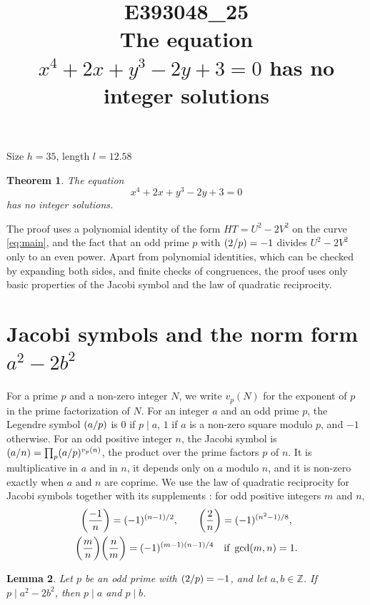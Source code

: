 \documentclass[11pt]{article}
\title{\textbf{E393048\_25}\\[4pt] {\Large The equation $x^{4}+2x+y^{3}-2y+3=0$ has no integer solutions}}
\author{}
\date{}
\newtheorem{theorem}{Theorem}
\newtheorem{lemma}[theorem]{Lemma}
\newcommand{\Z}{\mathbb{Z}}
\newcommand{\leg}[2]{\mathchoice{\biggl(\dfrac{#1}{#2}\biggr)}{(#1/#2)}{(#1/#2)}{(#1/#2)}}
\begin{document}
\maketitle
\vspace{-8ex}
\begin{center}
Size $h=35$, length $l=12.58$
\end{center}

\begin{theorem}\label{thm:main}
The equation
\begin{equation}\label{eq:main}
x^{4}+2x+y^{3}-2y+3=0
\end{equation}
has no integer solutions.
\end{theorem}

The proof uses a polynomial identity of the form $HT=U^2-2V^2$ on the curve \eqref{eq:main}, and the fact that an odd prime $p$ with $\leg{2}{p}=-1$ divides $U^2-2V^2$ only to an even power. Apart from polynomial identities, which can be checked by expanding both sides, and finite checks of congruences, the proof uses only basic properties of the Jacobi symbol and the law of quadratic reciprocity.

\section{\texorpdfstring{Jacobi symbols and the norm form $a^2-2b^2$}{Jacobi symbols and the norm form}}

For a prime $p$ and a non-zero integer $N$, we write $v_p(N)$ for the exponent of $p$ in the prime factorization of $N$. For an integer $a$ and an odd prime $p$, the Legendre symbol $\leg{a}{p}$ is $0$ if $p\mid a$, $1$ if $a$ is a non-zero square modulo $p$, and $-1$ otherwise. For an odd positive integer $n$, the Jacobi symbol is $\leg{a}{n}=\prod_p\leg{a}{p}^{v_p(n)}$, the product over the prime factors $p$ of $n$. It is multiplicative in $a$ and in $n$, it depends only on $a$ modulo $n$, and it is non-zero exactly when $a$ and $n$ are coprime. We use the law of quadratic reciprocity for Jacobi symbols together with its supplements \cite[Chapter~5, \S2]{IR}: for odd positive integers $m$ and $n$,
\begin{gather*}
\leg{-1}{n}=(-1)^{(n-1)/2},\qquad\leg{2}{n}=(-1)^{(n^2-1)/8},\\
\leg{m}{n}\leg{n}{m}=(-1)^{(m-1)(n-1)/4}\quad\text{if }\gcd(m,n)=1.
\end{gather*}

\begin{lemma}\label{lem:divides}
Let $p$ be an odd prime with $\leg{2}{p}=-1$, and let $a,b\in\Z$. If $p\mid a^2-2b^2$, then $p\mid a$ and $p\mid b$.
\end{lemma}
\end{document}
